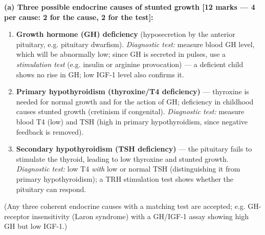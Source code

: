\documentclass[11pt]{article}
\begin{document}
\begin{corrige}
\textbf{(a) Three possible endocrine causes of stunted growth [12 marks — 4 per cause: 2 for the cause, 2 for the test]:}
\begin{enumerate}
\item \textbf{Growth hormone (GH) deficiency} (hyposecretion by the anterior pituitary, e.g. pituitary dwarfism). \emph{Diagnostic test:} measure blood GH level, which will be abnormally low; since GH is secreted in pulses, use a \emph{stimulation test} (e.g. insulin or arginine provocation) — a deficient child shows no rise in GH; low IGF-1 level also confirms it.
\item \textbf{Primary hypothyroidism (thyroxine/T4 deficiency)} — thyroxine is needed for normal growth and for the action of GH; deficiency in childhood causes stunted growth (cretinism if congenital). \emph{Diagnostic test:} measure blood T4 (low) and TSH (high in primary hypothyroidism, since negative feedback is removed).
\item \textbf{Secondary hypothyroidism (TSH deficiency)} — the pituitary fails to stimulate the thyroid, leading to low thyroxine and stunted growth. \emph{Diagnostic test:} low T4 \emph{with} low or normal TSH (distinguishing it from primary hypothyroidism); a TRH stimulation test shows whether the pituitary can respond.
\end{enumerate}
(Any three coherent endocrine causes with a matching test are accepted; e.g. GH-receptor insensitivity (Laron syndrome) with a GH/IGF-1 assay showing high GH but low IGF-1.)


\end{corrige}
\end{document}
